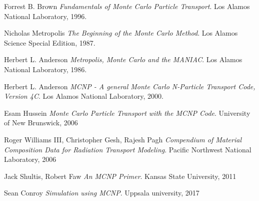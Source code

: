 \label{sec:bibliography}
\begin{thebibliography}{9}
Forrest B. Brown 
\textit{Fundamentals of Monte Carlo Particle Transport}.
Los Alamos National Laboratory, 1996.
 
Nicholas Metropolis
\textit{The Beginning of the Monte Carlo Method}.
Los Alamos Science Special Edition, 1987.
 
Herbert L. Anderson
\textit{Metropolis, Monte Carlo and the MANIAC}.
Los Alamos National Laboratory, 1986.

Herbert L. Anderson
\textit{MCNP - A general Monte Carlo N-Particle Transport Code, Version 4C}.
Los Alamos National Laboratory, 2000.

Esam Hussein
\textit{Monte Carlo Particle Transport with the MCNP Code}.
University of New Brunswick, 2006

Roger Williams III, Christopher Gesh, Rajesh Pagh
\textit{Compendium of Material Composition Data for Radiation Transport Modeling}.
Pacific Northwest National Laboratory, 2006

Jack Shultis, Robert Faw
\textit{An MCNP Primer}.
Kansas State University, 2011

Sean Conroy
\textit{Simulation using MCNP}.
Uppsala university, 2017
\end{thebibliography}